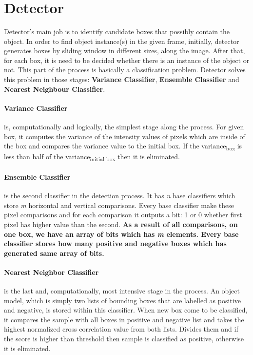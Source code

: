 \documentclass{report}
\begin{document}
    \section{Detector}
        \paragraph{}
            Detector's main job is to identify candidate boxes that possibly contain the object. In order to find
            object instance(s) in the given frame, initially, detector generates boxes by sliding window in different sizes,
            along the image. After that, for each box, it is need to be decided whether there is an instance of the object or not.
            This part of the process is basically a classification problem. Detector solves this problem in those stages:
            \textbf{Variance Classifier}, \textbf{Ensemble Classifier} and \textbf{Nearest Neighbour Classifier}.

        \paragraph{Variance Classifier}
            is, computationally and logically, the simplest stage along the process.
            For given box, it computes the variance of the intensity values of pixels which are inside of the box and
            compares the variance value to the initial box. If the variance\textsubscript{box} is less than half of the  variance\textsubscript{initial box}
            then it is eliminated.

        \paragraph{Ensemble Classifier} is the second classifier in the detection process. It has
            \emph{n} base classifiers which store \emph{m} horizontal and vertical comparisons.
            Every base classifier make these pixel comparisons and for each comparison it outputs a bit: 1 or 0
            whether first pixel has higher value than the second.
            \textbf{As a result of all comparisons, on one box, we have an array of bits which has \emph{m} elements.
            Every base classifier stores how many positive and negative boxes which has generated same array of bits.}

        \paragraph{Nearest Neighbor Classifier} is the last and, computationally, most intensive stage in the process.
            An object model, which is simply two lists of bounding boxes that are labelled as positive and negative, is stored
            within this classifier. When new box come to be classified, it compares the sample with all
            boxes in positive and negative list and takes the highest normalized cross correlation value from both lists.
            Divides them and if the score is higher than threshold then sample is classified as positive,
            otherwise it is eliminated.
\end{document}
